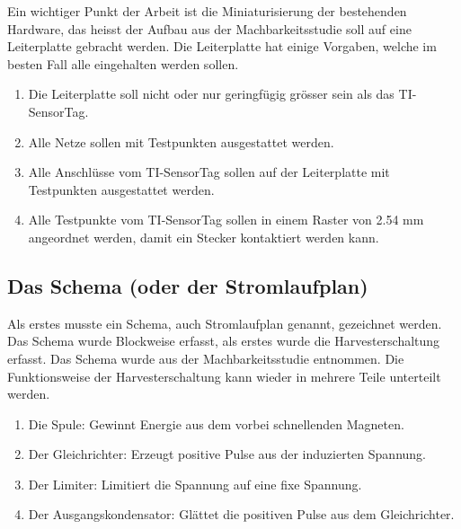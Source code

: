 Ein wichtiger Punkt der Arbeit ist die Miniaturisierung der bestehenden Hardware, das heisst der Aufbau aus der Machbarkeitsstudie soll auf eine Leiterplatte gebracht werden. Die Leiterplatte hat einige Vorgaben, welche im besten Fall alle eingehalten werden sollen.

\begin{enumerate}
    \item Die Leiterplatte soll nicht oder nur geringfügig grösser sein als das TI-SensorTag.
    
    \item Alle Netze sollen mit Testpunkten ausgestattet werden.
    
    \item Alle Anschlüsse vom TI-SensorTag sollen auf der Leiterplatte mit Testpunkten ausgestattet werden.
    
    \item Alle Testpunkte vom TI-SensorTag sollen in einem Raster von 2.54 mm angeordnet werden, damit ein Stecker kontaktiert werden kann.
    
\end{enumerate}
	


\subsection{Das Schema (oder der Stromlaufplan)}
Als erstes musste ein Schema, auch Stromlaufplan genannt, gezeichnet werden. Das Schema wurde Blockweise erfasst, als erstes wurde die Harvesterschaltung erfasst. Das Schema wurde aus der Machbarkeitsstudie entnommen. Die Funktionsweise der Harvesterschaltung kann wieder in mehrere Teile unterteilt werden.

\begin{enumerate}
    \item Die Spule: Gewinnt Energie aus dem vorbei schnellenden Magneten.
    
    \item Der Gleichrichter: Erzeugt positive Pulse aus der induzierten Spannung.
    
    \item Der Limiter: Limitiert die Spannung auf eine fixe Spannung.
    
    \item Der Ausgangskondensator: Glättet die positiven Pulse aus dem Gleichrichter.
    
\end{enumerate}

